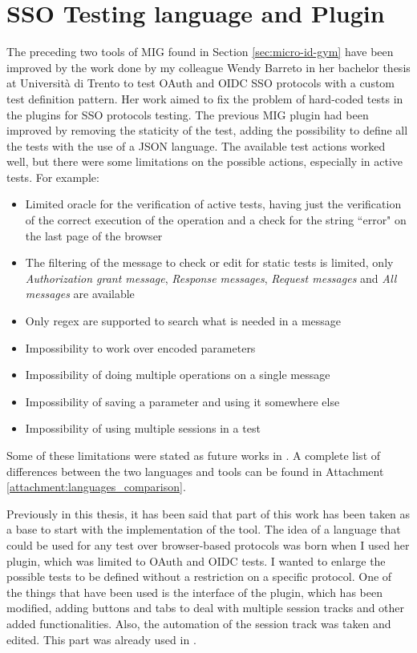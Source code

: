\section{SSO Testing language and Plugin}
The preceding two tools of MIG found in Section \ref{sec:micro-id-gym} have been improved by the work done by my colleague Wendy Barreto \cite{wendy_barreto} in her bachelor thesis at Università di Trento to test \gls{OAuth} and \gls{OIDC} SSO protocols with a custom test definition pattern. Her work aimed to fix the problem of hard-coded tests in the plugins for SSO protocols testing. The previous MIG plugin had been improved by removing the staticity of the test, adding the possibility to define all the tests with the use of a JSON language.
The available test actions worked well, but there were some limitations on the possible actions, especially in active tests. For example:
\begin{itemize}
    \item Limited oracle for the verification of active tests, having just the verification of the correct execution of the operation and a check for the string ``error" on the last page of the browser
    \item The filtering of the message to check or edit for static tests is limited, only \textit{Authorization grant message}, \textit{Response messages}, \textit{Request messages} and \textit{All messages} are available
    \item Only regex are supported to search what is needed in a message
    \item Impossibility to work over encoded parameters
    \item Impossibility of doing multiple operations on a single message
    \item Impossibility of saving a parameter and using it somewhere else
    \item Impossibility of using multiple sessions in a test
\end{itemize}
Some of these limitations were stated as future works in \cite{wendy_barreto}. A complete list of differences between the two languages and tools can be found in Attachment \ref{attachment:languages_comparison}.

Previously in this thesis, it has been said that part of this work has been taken as a base to start with the implementation of the tool. The idea of a language that could be used for any test over browser-based protocols was born when I used her plugin, which was limited to \gls{OAuth} and \gls{OIDC} tests. I wanted to enlarge the possible tests to be defined without a restriction on a specific protocol. 
One of the things that have been used is the interface of the plugin, which has been modified, adding buttons and tabs to deal with multiple \gls{session track}s and other added functionalities. Also, the automation of the \gls{session track} was taken and edited. This part was already used in \cite{claudio_grisenti,stefano_facchini}.




